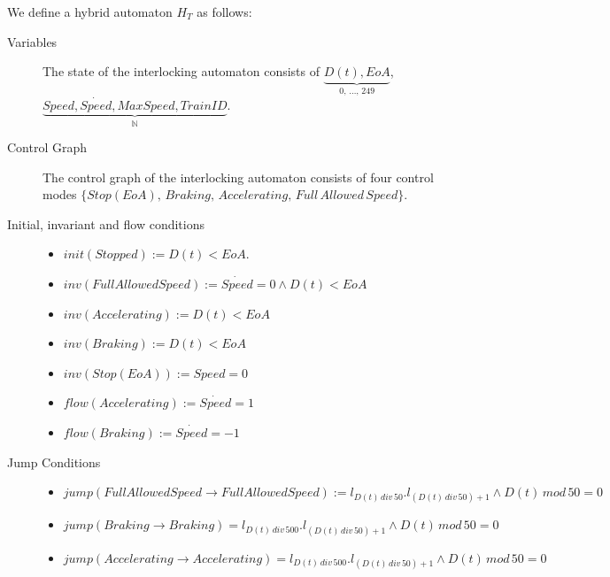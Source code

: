 \begin{mydef}

We define a hybrid automaton $H_{T}$ as follows:
\begin{description}
\item[Variables] The state of the interlocking automaton consists of $\underbrace{D(t), EoA}_\text{0, \ldots , 249}$, \newline $\underbrace{Speed, \dot{Speed}, MaxSpeed, TrainID}_{\mathbb{N}}$.

\item[Control Graph] The control graph of the interlocking automaton consists of four control modes $\{Stop (EoA), \, Braking, \, Accelerating, \, Full \, Allowed \, Speed \}$.

\item[Initial, invariant and flow conditions] \hspace*{0mm}
	\begin{itemize}
	\item $init(Stopped) :=   D(t) < EoA  $.

	\item $inv(Full Allowed Speed) :=   \dot{Speed} = 0 \wedge D(t) < EoA$ 

	\item $inv(Accelerating) := D(t) < EoA$

	\item $inv(Braking)  := D(t) < EoA$
	
	\item $inv(Stop (EoA)) := Speed = 0$ 

	\item $flow(Accelerating):= \dot{Speed} = 1$ 
	
	\item $flow(Braking) := \dot{Speed} = -1$
	
	\end{itemize}

\item[Jump Conditions] \hspace*{0mm}

	\begin{itemize}
	\item $jump(Full Allowed Speed \to Full Allowed Speed) := l_{D(t) \, div \, 50}.l_{(D(t) \, div \, 50) +1} \wedge D(t) \, mod \, 50 = 0$
\item $jump(Braking \to Braking) = l_{D(t) \, div \, 500}.l_{(D(t) \, div \, 50) +1} \wedge D(t) \, mod \, 50 = 0$
\item $jump(Accelerating \to Accelerating) = l_{D(t) \, div \, 500}.l_{(D(t) \, div \, 50) +1} \wedge D(t) \, mod \, 50 = 0$


\end{itemize}
\end{description}
\end{mydef}
